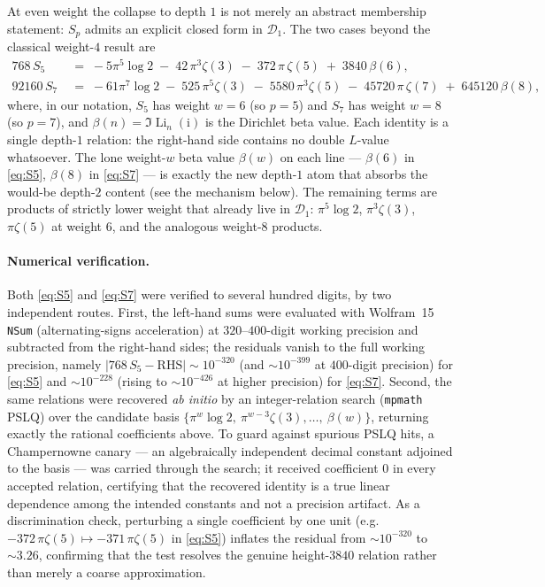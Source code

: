 \documentclass[11pt]{article}
\DeclareMathOperator{\Li}{Li}
\newcommand{\iu}{\mathrm{i}}
\theoremstyle{plain}
\theoremstyle{remark}
\begin{document}
At even weight the collapse to depth $1$ is not merely an abstract membership statement: $S_p$ admits an explicit closed form in $\mathcal{D}_1$. The two cases beyond the classical weight-$4$ result are
\begin{align}
  768\,S_5 \;&=\; -5\pi^5\log 2 \;-\; 42\,\pi^3\zeta(3) \;-\; 372\,\pi\,\zeta(5) \;+\; 3840\,\beta(6),
  \label{eq:S5}\\[4pt]
  92160\,S_7 \;&=\; -61\pi^7\log 2 \;-\; 525\,\pi^5\zeta(3) \;-\; 5580\,\pi^3\zeta(5) \;-\; 45720\,\pi\,\zeta(7) \;+\; 645120\,\beta(8),
  \label{eq:S7}
\end{align}
where, in our notation, $S_5$ has weight $w=6$ (so $p=5$) and $S_7$ has weight $w=8$ (so $p=7$), and $\beta(n)=\Im\Li_n(\iu)$ is the Dirichlet beta value. Each identity is a single depth-$1$ relation: the right-hand side contains no double $L$-value whatsoever. The lone weight-$w$ beta value $\beta(w)$ on each line --- $\beta(6)$ in \eqref{eq:S5}, $\beta(8)$ in \eqref{eq:S7} --- is exactly the new depth-$1$ atom that absorbs the would-be depth-$2$ content (see the mechanism below). The remaining terms are products of strictly lower weight that already live in $\mathcal{D}_1$: $\pi^5\log2$, $\pi^3\zeta(3)$, $\pi\zeta(5)$ at weight $6$, and the analogous weight-$8$ products.

\paragraph{Numerical verification.}
Both \eqref{eq:S5} and \eqref{eq:S7} were verified to several hundred digits, by two independent routes. First, the left-hand sums were evaluated with Wolfram~15 \texttt{NSum} (alternating-signs acceleration) at $320$--$400$-digit working precision and subtracted from the right-hand sides; the residuals vanish to the full working precision, namely $\lvert 768\,S_5 - \mathrm{RHS}\rvert \sim 10^{-320}$ (and $\sim 10^{-399}$ at $400$-digit precision) for \eqref{eq:S5} and $\sim 10^{-228}$ (rising to $\sim 10^{-426}$ at higher precision) for \eqref{eq:S7}. Second, the same relations were recovered \emph{ab initio} by an integer-relation search (\texttt{mpmath} PSLQ) over the candidate basis $\{\pi^w\!\log 2,\ \pi^{w-3}\zeta(3),\dots,\ \beta(w)\}$, returning exactly the rational coefficients above. To guard against spurious PSLQ hits, a Champernowne canary --- an algebraically independent decimal constant adjoined to the basis --- was carried through the search; it received coefficient $0$ in every accepted relation, certifying that the recovered identity is a true linear dependence among the intended constants and not a precision artifact. As a discrimination check, perturbing a single coefficient by one unit (e.g.\ $-372\,\pi\zeta(5)\mapsto -371\,\pi\zeta(5)$ in \eqref{eq:S5}) inflates the residual from $\sim 10^{-320}$ to $\sim 3.26$, confirming that the test resolves the genuine height-$3840$ relation rather than merely a coarse approximation.
\end{document}
